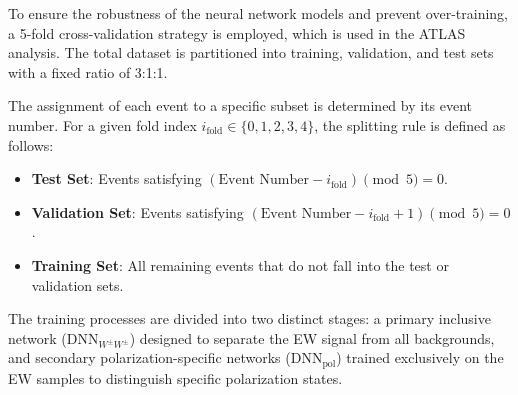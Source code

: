 \documentclass[12pt]{article}
\begin{document}
        To ensure the robustness of the neural network models and prevent over-training, a 5-fold cross-validation strategy is employed, which is used in the ATLAS analysis. The total dataset is partitioned into training, validation, and test sets with a fixed ratio of 3:1:1.

        The assignment of each event to a specific subset is determined by its event number. For a given fold index $i_{\text{fold}} \in \{0, 1, 2, 3, 4\}$, the splitting rule is defined as follows:
        \begin{itemize}
            \item \textbf{Test Set}: Events satisfying $(\text{Event Number} - i_{\text{fold}}) \pmod 5 = 0$.
            \item \textbf{Validation Set}: Events satisfying $(\text{Event Number} - i_{\text{fold}} + 1) \pmod 5 = 0$.
            \item \textbf{Training Set}: All remaining events that do not fall into the test or validation sets.
        \end{itemize}

        The training processes are divided into two distinct stages: a primary inclusive network ($\text{DNN}_{W^{\pm}W^{\pm}}$) designed to separate the EW signal from all backgrounds, and secondary polarization-specific networks ($\text{DNN}_{\text{pol}}$) trained exclusively on the EW samples to distinguish specific polarization states.
\end{document}

